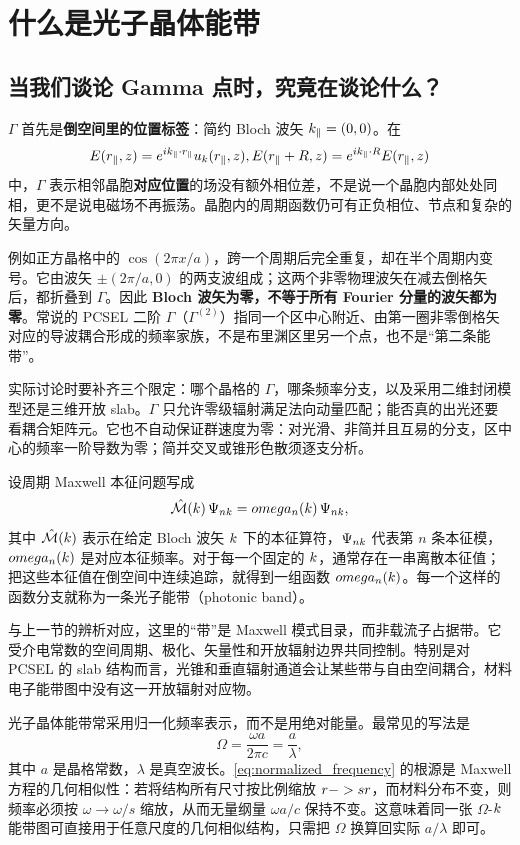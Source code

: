 \section{什么是光子晶体能带}
\subsection*{当我们谈论 Gamma 点时，究竟在谈论什么？}
$\Gamma$ 首先是\textbf{倒空间里的位置标签}：简约 Bloch 波矢 $k_\parallel=(0,0)$。在
\[
E(r_\parallel,z)=e^{ik_\parallel\cdot r_\parallel}
u_{k}(r_\parallel,z),
E(r_\parallel+R,z)=e^{ik_\parallel\cdot R}E(r_\parallel,z)
\]
中，$\Gamma$ 表示相邻晶胞\textbf{对应位置}的场没有额外相位差，不是说一个晶胞内部处处同相，更不是说电磁场不再振荡。晶胞内的周期函数仍可有正负相位、节点和复杂的矢量方向。

例如正方晶格中的 $\cos(2\pi x/a)$，跨一个周期后完全重复，却在半个周期内变号。它由波矢 $\pm(2\pi/a,0)$ 的两支波组成；这两个非零物理波矢在减去倒格矢后，都折叠到 $\Gamma$。因此 \textbf{Bloch 波矢为零，不等于所有 Fourier 分量的波矢都为零}。常说的 PCSEL 二阶 $\Gamma$（$\Gamma^{(2)}$）指同一个区中心附近、由第一圈非零倒格矢对应的导波耦合形成的频率家族，不是布里渊区里另一个点，也不是“第二条能带”。

实际讨论时要补齐三个限定：哪个晶格的 $\Gamma$，哪条频率分支，以及采用二维封闭模型还是三维开放 slab。$\Gamma$ 只允许零级辐射满足法向动量匹配；能否真的出光还要看耦合矩阵元。它也不自动保证群速度为零：对光滑、非简并且互易的分支，区中心的频率一阶导数为零；简并交叉或锥形色散须逐支分析。

设周期 Maxwell 本征问题写成
\begin{equation}
\hat{\mathcal M}(k)\,\Psi_{nk}
=
omega_n(k)\,\Psi_{nk},
\label{eq:band_eigenproblem_generic}
\end{equation}
其中 $\hat{\mathcal M}(k)$ 表示在给定 Bloch 波矢 $k$ 下的本征算符，$\Psi_{nk}$ 代表第 $n$ 条本征模，$omega_n(k)$ 是对应本征频率。对于每一个固定的 $k$，通常存在一串离散本征值；把这些本征值在倒空间中连续追踪，就得到一组函数 $omega_n(k)$。每一个这样的函数分支就称为一条光子能带（photonic band）。

与上一节的辨析对应，这里的“带”是 Maxwell 模式目录，而非载流子占据带。它受介电常数的空间周期、极化、矢量性和开放辐射边界共同控制。特别是对 PCSEL 的 slab 结构而言，光锥和垂直辐射通道会让某些带与自由空间耦合，材料电子能带图中没有这一开放辐射对应物。

光子晶体能带常采用归一化频率表示，而不是用绝对能量。最常见的写法是
\begin{equation}
\Omega = \frac{\omega a}{2\pi c} = \frac{a}{\lambda},
\label{eq:normalized_frequency}
\end{equation}
其中 $a$ 是晶格常数，$\lambda$ 是真空波长。\cref{eq:normalized_frequency} 的根源是 Maxwell 方程的几何相似性：若将结构所有尺寸按比例缩放 $r-> sr$，而材料分布不变，则频率必须按 $\omega\to\omega/s$ 缩放，从而无量纲量 $\omega a/c$ 保持不变。这意味着同一张 $\Omega$-$k$ 能带图可直接用于任意尺度的几何相似结构，只需把 $\Omega$ 换算回实际 $a/\lambda$ 即可。

